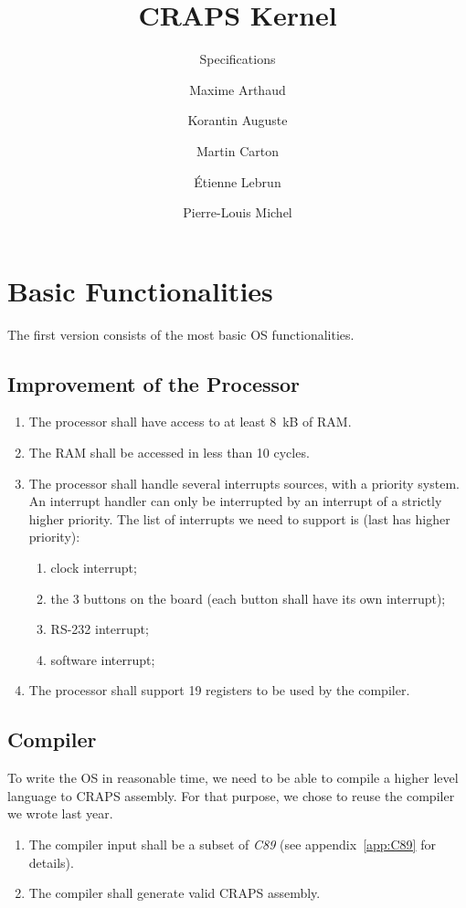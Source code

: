 \documentclass{article}
\title{CRAPS Kernel}
\subtitle{Specifications}
\author{
       Maxime Arthaud
  \and Korantin Auguste
  \and Martin Carton
  \and Étienne Lebrun
  \and Pierre-Louis Michel
}
\begin{document}
  
  \newpage
    \section{Basic Functionalities}
      The first version consists of the most basic OS functionalities.

      \subsection{Improvement of the Processor}
        \begin{enumerate}
          \item The processor shall have access to at least \SI{8}{kB} of RAM.
          \item The RAM shall be accessed in less than 10 cycles.
          \item The processor shall handle several interrupts sources, with a
            priority system. An interrupt handler can only be interrupted by an
            interrupt of a strictly higher priority. The list of interrupts we
            need to support is (last has higher priority):
            \begin{enumerate}
              \item clock interrupt;
              \item the 3 buttons on the board (each button shall have its own
                interrupt);
              \item RS-232 interrupt;
              \item software interrupt;
            \end{enumerate}
          \item The processor shall support 19 registers to be used by the
            compiler.
        \end{enumerate}

      \subsection{Compiler}
        To write the OS in reasonable time, we need to be able to compile a
        higher level language to CRAPS assembly. For that purpose, we chose to
        reuse the compiler we wrote last year.
        \begin{enumerate}
          \item The compiler input shall be a subset of \textit{C89} (see
            appendix~\ref{app:C89} for details).
          \item The compiler shall generate valid CRAPS assembly.
        \end{enumerate}
\end{document}
